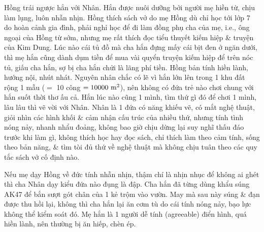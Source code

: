 \documentclass[12pt,twoside]{book}
\begin{document}
{\sf Hồng} trái ngược hẳn với {\sf Nhân}. Hắn được nuôi dưỡng bởi người mẹ hiền từ, chịu làm lụng, luôn nhẫn nhịn. {\sf Hồng} thích sách vở do mẹ {\sf Hồng} dù chỉ học tới lớp 7 do hoàn cảnh gia đình, phải nghỉ học để đi làm đồng phụ cha của mẹ, i.e., ông ngoại của {\sf Hồng} từ sớm, nhưng mẹ rất thích đọc tiểu thuyết kiếm hiệp \& truyện của {\sc Kim Dung}. Lúc nào cái tủ đồ mà cha hắn đựng mấy cái bịt đen ở ngăn dưới, thì mẹ hắn cũng dành dụm tiền để mua vài quyển truyện kiếm hiệp để trên nóc tủ, giấu cha hắn, sợ bị cha hắn chửi là lãng phí tiền. {\sf Hồng} bản tính hiền lành, hướng nội, nhút nhát. Nguyên nhân chắc có lẽ vì hắn lớn lên trong 1 khu đất rộng 1 mẫu ($=$ 10 công $= 10000\ {\rm m}^2$), nên không có đứa trẻ nào chơi chung với hắn suốt thời thơ ấu cả. Hắn lúc nào cũng 1 mình, tìm thứ gì đó để chơi 1 mình, lâu lâu thì vẽ vời với {\sf Nhân}. {\sf Nhân} là 1 đứa có năng khiếu vẽ, có mắt nghệ thuật, giỏi nhìn các hình khối \& cảm nhận cấu trúc của nhiều thứ, nhưng tính tình nóng nảy, nhanh nhẩu đoảng, không bao giờ chịu dừng lại suy nghĩ thấu đáo trước khi làm gì, không thích học hay đọc sách, chỉ thích làm theo cảm tính, sống theo bản năng, \& tìm tòi đủ thứ về nghệ thuật mà không chịu tuân theo các quy tắc sách vở cố định nào.

Nếu mẹ dạy {\sf Hồng} về đức tính nhẫn nhịn, thậm chí là nhịn nhục để không ai ghét thì cha {\sf Nhân} dạy kiểu đứa nào đụng là đập. Cha hắn đã từng dùng khẩu súng AK47 để bắn sượt gót chân của 1 kẻ trộm vào vườn. May mà sau này súng \& đạn được thu hồi lại, không thì cha hắn lại ăn cơm tù do cái tính nóng nảy, bạo lực không thể kiểm soát đó. Mẹ hắn là 1 người dễ tính (agreeable) điển hình, quá hiền lành, nên thường bị ăn hiếp, chèn ép. 
\end{document}
